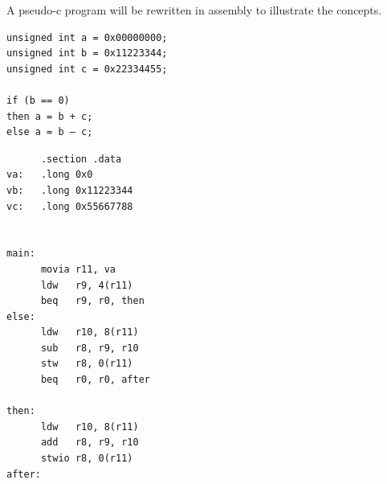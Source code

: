 \documentclass[../notes.tex]{subfiles}
\begin{document}
A pseudo-c program will be rewritten in assembly to illustrate the concepts.

\begin{listing}[H]
\begin{verbatim}
unsigned int a = 0x00000000;
unsigned int b = 0x11223344;
unsigned int c = 0x22334455;

if (b == 0)
then a = b + c;
else a = b – c;

\end{verbatim}
\end{listing}

\begin{listing}[H]
\begin{verbatim}
      .section .data
va:   .long 0x0
vb:   .long 0x11223344
vc:   .long 0x55667788
 

main:
      movia r11, va
      ldw   r9, 4(r11)
      beq   r9, r0, then
else:
      ldw   r10, 8(r11)
      sub   r8, r9, r10
      stw   r8, 0(r11)
      beq   r0, r0, after

then:
      ldw   r10, 8(r11)
      add   r8, r9, r10
      stwio r8, 0(r11)
after:
\end{verbatim}
\end{listing}
\end{document}
